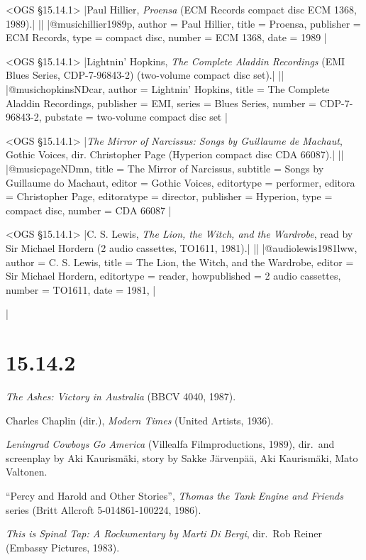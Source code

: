 \documentclass[extrafontsizes,11pt,a4paper,oneside]{memoir}
\begin{document}
\bibexample<OGS \S15.14.1>
|Paul Hillier, \emph{Proensa} (ECM Records compact disc ECM 1368, 1989).|%
||%
|@music{hillier1989p,
  author = {Paul Hillier},
  title = {Proensa},
  publisher = {ECM Records},
  type = {compact disc},
  number = {ECM 1368},
  date = {1989}
}|

\bibexample<OGS \S15.14.1>
|Lightnin' Hopkins, \emph{The Complete Aladdin Recordings} (EMI Blues Series, CDP-7-96843-2) (two-volume compact disc set).|%
||%
|@music{hopkinsNDcar,
  author = {Lightnin’ Hopkins},
  title = {The Complete Aladdin Recordings},
  publisher = {EMI},
  series = {Blues Series},
  number = {CDP-7-96843-2},
  pubstate = {two-volume compact disc set}
}|

\bibexample<OGS \S15.14.1>
|\emph{The Mirror of Narcissus: Songs by Guillaume de Machaut}, Gothic Voices, dir. Christopher Page (Hyperion compact disc CDA 66087).|%
||%
|@music{pageNDmn,
  title = {The Mirror of Narcissus},
  subtitle = {Songs by Guillaume do Machaut},
  editor = {Gothic Voices},
  editortype = {performer},
  editora = {Christopher Page},
  editoratype = {director},
  publisher = {Hyperion},
  type = {compact disc},
  number = {CDA 66087}
}|

\bibexample<OGS \S15.14.1>
|C. S. Lewis, \emph{The Lion, the Witch, and the Wardrobe}, read by Sir Michael Hordern (2 audio cassettes, TO1611, 1981).|%
||%
|@audio{lewis1981lww,
  author = {C. S. Lewis},
  title = {The Lion, the Witch, and the Wardrobe},
  editor = {Sir Michael Hordern},
  editortype = {reader},
  howpublished = {2 audio cassettes},
  number = {TO1611},
  date = {1981},
}|

\todoc|
\section*{15.14.2} %

\emph{The Ashes: Victory in Australia} (BBCV 4040, 1987).

Charles Chaplin (dir.), \emph{Modern Times} (United Artists, 1936).

\emph{Leningrad Cowboys Go America} (Villealfa Filmproductions, 1989), dir.\ and screenplay by Aki Kaurismäki, story by Sakke Järvenpää, Aki Kaurismäki, Mato Valtonen.

\enquote{Percy and Harold and Other Stories}, \emph{Thomas the Tank Engine and Friends} series (Britt Allcroft 5-014861-100224, 1986).

\emph{This is Spinal Tap: A Rockumentary by Marti Di Bergi}, dir.\ Rob Reiner (Embassy Pictures, 1983).
\end{document}
